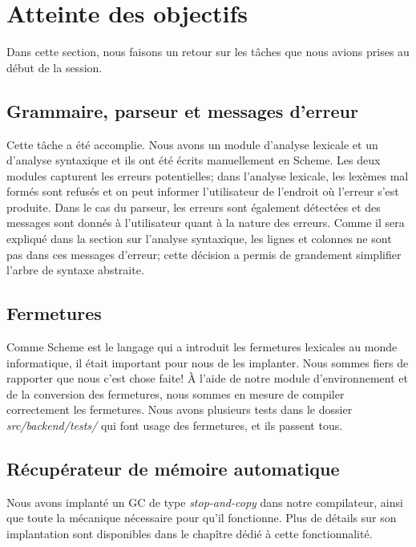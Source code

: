 \documentclass[10pt]{report}
\begin{document}
\section{Atteinte des objectifs}

Dans cette section, nous faisons un retour sur les tâches que nous
avions prises au début de la session.

\subsection{Grammaire, parseur et messages d'erreur}

Cette tâche a été accomplie. Nous avons un module d'analyse lexicale
et un d'analyse syntaxique et ils ont été écrits manuellement en
Scheme. Les deux modules capturent les erreurs potentielles; dans
l'analyse lexicale, les lexèmes mal formés sont refusés et on peut
informer l'utilisateur de l'endroit où l'erreur s'est produite. Dans
le cas du parseur, les erreurs sont également détectées et des
messages sont donnés à l'utilisateur quant à la nature des erreurs.
Comme il sera expliqué dans la section sur l'analyse syntaxique, les
lignes et colonnes ne sont pas dans ces messages d'erreur; cette
décision a permis de grandement simplifier l'arbre de syntaxe
abstraite.


\subsection{Fermetures}

Comme Scheme est le langage qui a introduit les fermetures lexicales
au monde informatique, il était important pour nous de les implanter.
Nous sommes fiers de rapporter que nous c'est chose faite!  À l'aide
de notre module d'environnement et de la conversion des fermetures,
nous sommes en mesure de compiler correctement les fermetures.  Nous
avons plusieurs tests dans le dossier {\it src/backend/tests/} qui
font usage des fermetures, et ils passent tous.

\subsection{Récupérateur de mémoire automatique}

Nous avons implanté un GC de type {\it stop-and-copy} dans notre
compilateur, ainsi que toute la mécanique nécessaire pour qu'il
fonctionne. Plus de détails sur son implantation sont disponibles dans
le chapître dédié à cette fonctionnalité.
\end{document}
